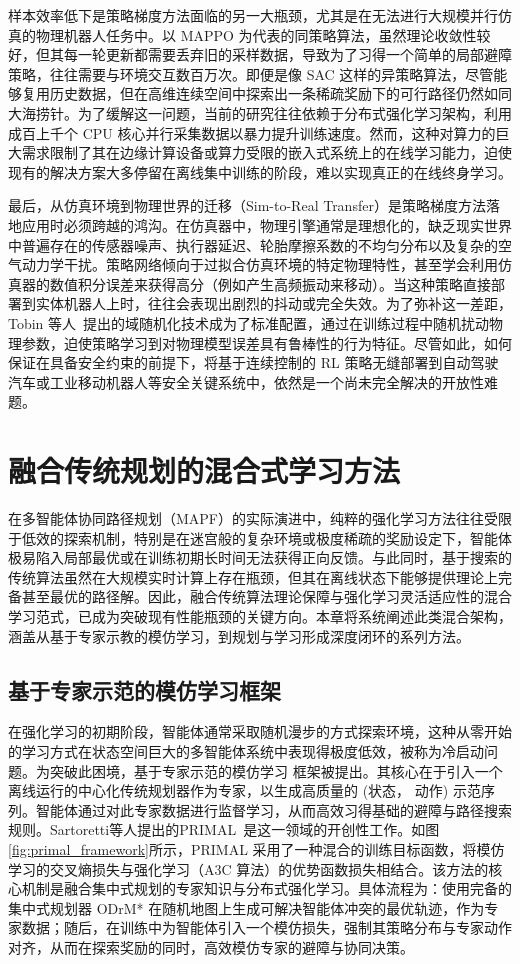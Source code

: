 \documentclass[13.5pt]{extarticle}
\newcommand{\figref}[1]{\hypersetup{linkcolor=red}\ref{#1}}
\begin{document}
样本效率低下是策略梯度方法面临的另一大瓶颈，尤其是在无法进行大规模并行仿真的物理机器人任务中。以 MAPPO 为代表的同策略算法，虽然理论收敛性较好，但其每一轮更新都需要丢弃旧的采样数据，导致为了习得一个简单的局部避障策略，往往需要与环境交互数百万次。即便是像 SAC 这样的异策略算法，尽管能够复用历史数据，但在高维连续空间中探索出一条稀疏奖励下的可行路径仍然如同大海捞针。为了缓解这一问题，当前的研究往往依赖于分布式强化学习架构，利用成百上千个 CPU 核心并行采集数据以暴力提升训练速度。然而，这种对算力的巨大需求限制了其在边缘计算设备或算力受限的嵌入式系统上的在线学习能力，迫使现有的解决方案大多停留在离线集中训练的阶段，难以实现真正的在线终身学习。

最后，从仿真环境到物理世界的迁移（Sim-to-Real Transfer）是策略梯度方法落地应用时必须跨越的鸿沟。在仿真器中，物理引擎通常是理想化的，缺乏现实世界中普遍存在的传感器噪声、执行器延迟、轮胎摩擦系数的不均匀分布以及复杂的空气动力学干扰。策略网络倾向于过拟合仿真环境的特定物理特性，甚至学会利用仿真器的数值积分误差来获得高分（例如产生高频振动来移动）。当这种策略直接部署到实体机器人上时，往往会表现出剧烈的抖动或完全失效。为了弥补这一差距，Tobin 等人~\cite{tobin2017domain}提出的域随机化技术成为了标准配置，通过在训练过程中随机扰动物理参数，迫使策略学习到对物理模型误差具有鲁棒性的行为特征。尽管如此，如何保证在具备安全约束的前提下，将基于连续控制的 RL 策略无缝部署到自动驾驶汽车或工业移动机器人等安全关键系统中，依然是一个尚未完全解决的开放性难题。

\section{融合传统规划的混合式学习方法}

在多智能体协同路径规划（MAPF）的实际演进中，纯粹的强化学习方法往往受限于低效的探索机制，特别是在迷宫般的复杂环境或极度稀疏的奖励设定下，智能体极易陷入局部最优或在训练初期长时间无法获得正向反馈。与此同时，基于搜索的传统算法虽然在大规模实时计算上存在瓶颈，但其在离线状态下能够提供理论上完备甚至最优的路径解。因此，融合传统算法理论保障与强化学习灵活适应性的混合学习范式，已成为突破现有性能瓶颈的关键方向。本章将系统阐述此类混合架构，涵盖从基于专家示教的模仿学习，到规划与学习形成深度闭环的系列方法。

\subsection{基于专家示范的模仿学习框架}

在强化学习的初期阶段，智能体通常采取随机漫步的方式探索环境，这种从零开始的学习方式在状态空间巨大的多智能体系统中表现得极度低效，被称为冷启动问题。为突破此困境，基于专家示范的模仿学习 框架被提出。其核心在于引入一个离线运行的中心化传统规划器作为专家，以生成高质量的 (状态， 动作) 示范序列。智能体通过对此专家数据进行监督学习，从而高效习得基础的避障与路径搜索规则。Sartoretti等人提出的PRIMAL~\cite{sartoretti2019primal}是这一领域的开创性工作。如图\figref{fig:primal_framework}所示，PRIMAL 采用了一种混合的训练目标函数，将模仿学习的交叉熵损失与强化学习（A3C 算法）的优势函数损失相结合。该方法的核心机制是融合集中式规划的专家知识与分布式强化学习。具体流程为：使用完备的集中式规划器 ODrM* 在随机地图上生成可解决智能体冲突的最优轨迹，作为专家数据；随后，在训练中为智能体引入一个模仿损失，强制其策略分布与专家动作对齐，从而在探索奖励的同时，高效模仿专家的避障与协同决策。
\end{document}
